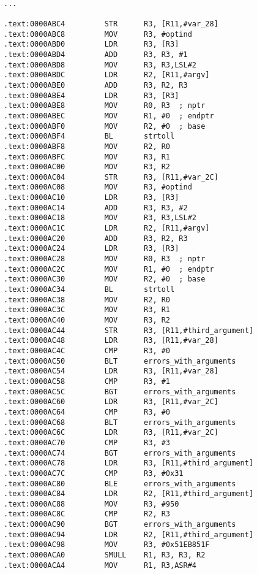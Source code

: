 \begin{lstlisting}

...

.text:0000ABC4         STR      R3, [R11,#var_28]
.text:0000ABC8         MOV      R3, #optind
.text:0000ABD0         LDR      R3, [R3]
.text:0000ABD4         ADD      R3, R3, #1
.text:0000ABD8         MOV      R3, R3,LSL#2
.text:0000ABDC         LDR      R2, [R11,#argv]
.text:0000ABE0         ADD      R3, R2, R3
.text:0000ABE4         LDR      R3, [R3]
.text:0000ABE8         MOV      R0, R3  ; nptr
.text:0000ABEC         MOV      R1, #0  ; endptr
.text:0000ABF0         MOV      R2, #0  ; base
.text:0000ABF4         BL       strtoll
.text:0000ABF8         MOV      R2, R0
.text:0000ABFC         MOV      R3, R1
.text:0000AC00         MOV      R3, R2
.text:0000AC04         STR      R3, [R11,#var_2C]
.text:0000AC08         MOV      R3, #optind
.text:0000AC10         LDR      R3, [R3]
.text:0000AC14         ADD      R3, R3, #2
.text:0000AC18         MOV      R3, R3,LSL#2
.text:0000AC1C         LDR      R2, [R11,#argv]
.text:0000AC20         ADD      R3, R2, R3
.text:0000AC24         LDR      R3, [R3]
.text:0000AC28         MOV      R0, R3  ; nptr
.text:0000AC2C         MOV      R1, #0  ; endptr
.text:0000AC30         MOV      R2, #0  ; base
.text:0000AC34         BL       strtoll
.text:0000AC38         MOV      R2, R0
.text:0000AC3C         MOV      R3, R1
.text:0000AC40         MOV      R3, R2
.text:0000AC44         STR      R3, [R11,#third_argument]
.text:0000AC48         LDR      R3, [R11,#var_28]
.text:0000AC4C         CMP      R3, #0
.text:0000AC50         BLT      errors_with_arguments
.text:0000AC54         LDR      R3, [R11,#var_28]
.text:0000AC58         CMP      R3, #1
.text:0000AC5C         BGT      errors_with_arguments
.text:0000AC60         LDR      R3, [R11,#var_2C]
.text:0000AC64         CMP      R3, #0
.text:0000AC68         BLT      errors_with_arguments
.text:0000AC6C         LDR      R3, [R11,#var_2C]
.text:0000AC70         CMP      R3, #3
.text:0000AC74         BGT      errors_with_arguments
.text:0000AC78         LDR      R3, [R11,#third_argument]
.text:0000AC7C         CMP      R3, #0x31
.text:0000AC80         BLE      errors_with_arguments
.text:0000AC84         LDR      R2, [R11,#third_argument]
.text:0000AC88         MOV      R3, #950
.text:0000AC8C         CMP      R2, R3
.text:0000AC90         BGT      errors_with_arguments
.text:0000AC94         LDR      R2, [R11,#third_argument]
.text:0000AC98         MOV      R3, #0x51EB851F
.text:0000ACA0         SMULL    R1, R3, R3, R2
.text:0000ACA4         MOV      R1, R3,ASR#4

\end{lstlisting}

